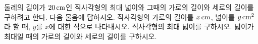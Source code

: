 둘레의 길이가 $20\mkern3mu \mathrm{cm}$인 직사각형의 최대 넓이와 그때의 가로의 길이와 세로의 길이를 구하려고 한다. 다음 물음에 답하시오.
 직사각형의 가로의 길이를 $x\mkern3mu \mathrm{cm}$, 넓이를 $y\mkern3mu \mathrm{cm}^2$라 할 때, $y$를 $x$에 대한 식으로 나타내시오.
 직사각형의 최대 넓이를 구하시오.
 넓이가 최대일 때의 가로의 길이와 세로의 길이를 구하시오.

